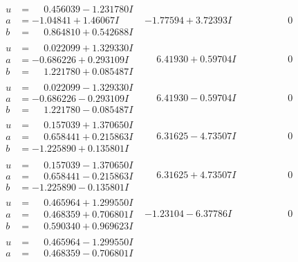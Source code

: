 \documentclass[1p]{elsarticle_modified}
\theoremstyle{definition}
\begin{document}
$$\begin{array}{c|c|c}
 \hline 
\begin{aligned}
u &= \phantom{-}0.456039 - 1.231780 I \\
a &= -1.04841 + 1.46067 I \\
b &= \phantom{-}0.864810 + 0.542688 I\end{aligned}
 & -1.77594 + 3.72393 I & \phantom{-0.000000 } 0 \\ \hline\begin{aligned}
u &= \phantom{-}0.022099 + 1.329330 I \\
a &= -0.686226 + 0.293109 I \\
b &= \phantom{-}1.221780 + 0.085487 I\end{aligned}
 & \phantom{-}6.41930 + 0.59704 I & \phantom{-0.000000 } 0 \\ \hline\begin{aligned}
u &= \phantom{-}0.022099 - 1.329330 I \\
a &= -0.686226 - 0.293109 I \\
b &= \phantom{-}1.221780 - 0.085487 I\end{aligned}
 & \phantom{-}6.41930 - 0.59704 I & \phantom{-0.000000 } 0 \\ \hline\begin{aligned}
u &= \phantom{-}0.157039 + 1.370650 I \\
a &= \phantom{-}0.658441 + 0.215863 I \\
b &= -1.225890 + 0.135801 I\end{aligned}
 & \phantom{-}6.31625 - 4.73507 I & \phantom{-0.000000 } 0 \\ \hline\begin{aligned}
u &= \phantom{-}0.157039 - 1.370650 I \\
a &= \phantom{-}0.658441 - 0.215863 I \\
b &= -1.225890 - 0.135801 I\end{aligned}
 & \phantom{-}6.31625 + 4.73507 I & \phantom{-0.000000 } 0 \\ \hline\begin{aligned}
u &= \phantom{-}0.465964 + 1.299550 I \\
a &= \phantom{-}0.468359 + 0.706801 I \\
b &= \phantom{-}0.590340 + 0.969623 I\end{aligned}
 & -1.23104 - 6.37786 I & \phantom{-0.000000 } 0 \\ \hline\begin{aligned}
u &= \phantom{-}0.465964 - 1.299550 I \\
a &= \phantom{-}0.468359 - 0.706801 I \\

\end{aligned}
\end{array}$$
\end{document}
